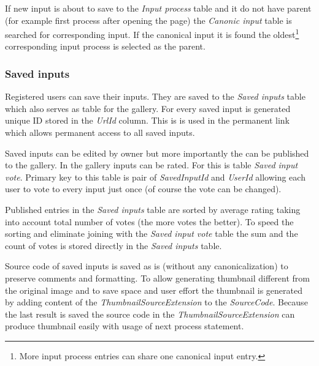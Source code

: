 If new input is about to save to the \emph{Input process} table and it do not have parent (for example first process after opening the page) the \emph{Canonic input} table is searched for corresponding input.
If the canonical input it is found the oldest\footnote{More input process entries can share one canonical input entry.} corresponding input process is selected as the parent.


\subsubsection{Saved inputs}

Registered users can save their inputs.
They are saved to the \emph{Saved inputs} table which also serves as table for the gallery.
For every saved input is generated unique ID stored in the \emph{UrlId} column.
This is is used in the permanent link which allows permanent access to all saved inputs.

Saved inputs can be edited by owner but more importantly the can be published to the gallery.
In the gallery inputs can be rated.
For this is table \emph{Saved input vote}.
Primary key to this table is pair of \emph{SavedInputId} and \emph{UserId} allowing each user to vote to every input just once (of course the vote can be changed).

Published entries in the \emph{Saved inputs} table are sorted by average rating taking into account total number of votes (the more votes the better).
To speed the sorting and eliminate joining with the \emph{Saved input vote} table the sum and the count of votes is stored directly in the \emph{Saved inputs} table.

Source code of saved inputs is saved as is (without any canonicalization) to preserve comments and formatting.
To allow generating thumbnail different from the original image and to save space and user effort the thumbnail is generated by adding content of the \emph{ThumbnailSourceExtension} to the \emph{SourceCode}.
Because the last result is saved the source code in the \emph{ThumbnailSourceExtension} can produce thumbnail easily with usage of next process statement.





































